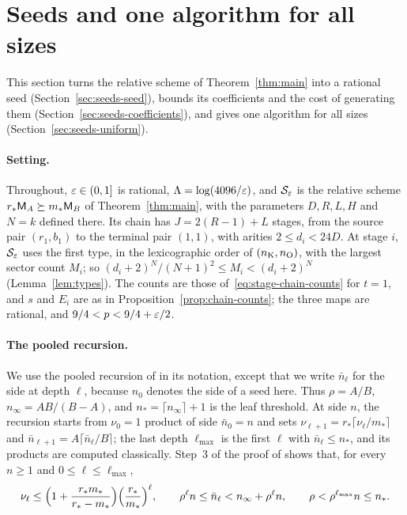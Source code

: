 \section{Seeds and one algorithm for all sizes}
\label{sec:seeds}

This section turns the relative scheme of Theorem~\ref{thm:main} into a
rational seed (Section~\ref{sec:seeds-seed}), bounds its coefficients and
the cost of generating them (Section~\ref{sec:seeds-coefficients}), and
gives one algorithm for all sizes (Section~\ref{sec:seeds-uniform}).

\paragraph{Setting.}
Throughout, \(\varepsilon\in(0,1]\) is rational, \(\Lambda=\log(4096/\varepsilon)\),
and \(\mathcal S_\varepsilon\) is the relative scheme \(r_*\mathsf M_A\succeq m_*\mathsf M_B\)
of Theorem~\ref{thm:main}, with the parameters \(D,R,L,H\) and \(N=k\)
defined there. Its chain has \(J=2(R-1)+L\) stages, from the source pair
\((r_1,b_1)\) to the terminal pair \((1,1)\), with arities
\(2\le d_i<24D\). At stage \(i\), \(\mathcal S_\varepsilon\) uses the first type,
in the lexicographic order of \((n_{\mathrm K},n_{\mathrm O})\), with the largest sector count
\(M_i\); so \((d_i+2)^N/(N+1)^2\le M_i<(d_i+2)^N\)
(Lemma~\ref{lem:types}). The counts are those
of~\eqref{eq:stage-chain-counts} for \(t=1\), and \(s\) and \(E_i\)
are as in Proposition~\ref{prop:chain-counts}; the three maps are
rational, and \(9/4<p<9/4+\varepsilon/2\).

\paragraph{The pooled recursion.}
We use the pooled recursion of \citep[Lemma~2.4]{FinCon26} in its
notation, except that we write \(\bar n_\ell\) for the side at depth
\(\ell\), because \(n_0\) denotes the side of a seed here. Thus
\(\rho=A/B\), \(n_\infty=AB/(B-A)\), and \(n_*=\lceil n_\infty\rceil+1\)
is the leaf threshold. At side \(n\), the recursion starts from
\(\nu_0=1\) product of side \(\bar n_0=n\) and sets
\(\nu_{\ell+1}=r_*\lceil\nu_\ell/m_*\rceil\) and
\(\bar n_{\ell+1}=A\lceil\bar n_\ell/B\rceil\); the last depth
\(\ell_{\max}\) is the first \(\ell\) with \(\bar n_\ell\le n_*\), and its
products are computed classically. Step~3 of the proof of
\citep[Lemma~2.4]{FinCon26} shows that, for every \(n\ge1\) and
\(0\le\ell\le\ell_{\max}\),
\begin{equation}\label{eq:seeds-pooled}
 \nu_\ell\le\Bigl(1+\frac{r_*m_*}{r_*-m_*}\Bigr)\Bigl(\frac{r_*}{m_*}\Bigr)^\ell,
 \qquad
 \rho^\ell n\le\bar n_\ell<n_\infty+\rho^\ell n,
 \qquad
 \rho<\rho^{\ell_{\max}}n\le n_*.
\end{equation}

